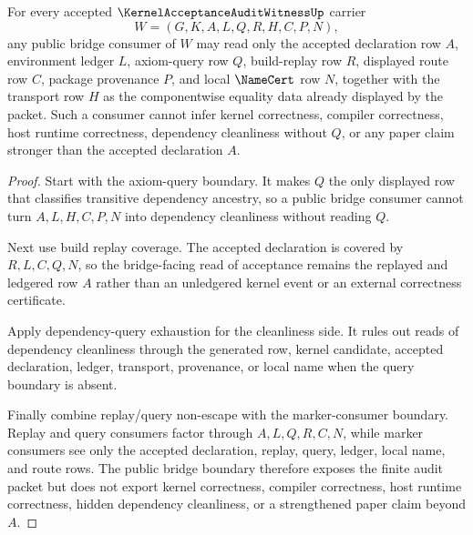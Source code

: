\begin{theorem}
\label{thm:kernel-acceptance-audit-witness-public-bridge-boundary}
For every accepted $\KernelAcceptanceAuditWitnessUp$ carrier
$$
W=(G,K,A,L,Q,R,H,C,P,N),
$$
any public bridge consumer of $W$ may read only the accepted declaration row $A$, environment ledger $L$, axiom-query row $Q$, build-replay row $R$, displayed route row $C$, package provenance $P$, and local $\NameCert$ row $N$, together with the transport row $H$ as the componentwise equality data already displayed by the packet. Such a consumer cannot infer kernel correctness, compiler correctness, host runtime correctness, dependency cleanliness without $Q$, or any paper claim stronger than the accepted declaration $A$.
\end{theorem}
\begin{proof}
Start with the axiom-query boundary. It makes $Q$ the only displayed row that classifies transitive dependency ancestry, so a public bridge consumer cannot turn $A,L,H,C,P,N$ into dependency cleanliness without reading $Q$.

Next use build replay coverage. The accepted declaration is covered by $R,L,C,Q,N$, so the bridge-facing read of acceptance remains the replayed and ledgered row $A$ rather than an unledgered kernel event or an external correctness certificate.

Apply dependency-query exhaustion for the cleanliness side. It rules out reads of dependency cleanliness through the generated row, kernel candidate, accepted declaration, ledger, transport, provenance, or local name when the query boundary is absent.

Finally combine replay/query non-escape with the marker-consumer boundary. Replay and query consumers factor through $A,L,Q,R,C,N$, while marker consumers see only the accepted declaration, replay, query, ledger, local name, and route rows. The public bridge boundary therefore exposes the finite audit packet but does not export kernel correctness, compiler correctness, host runtime correctness, hidden dependency cleanliness, or a strengthened paper claim beyond $A$.
\end{proof}

